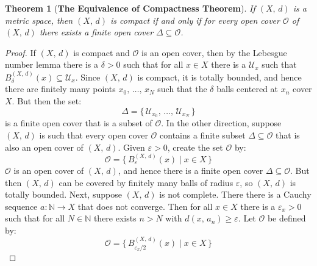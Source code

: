 \documentclass{article}
\theoremstyle{plain}
\newtheorem{theorem}{Theorem}[section]
\theoremstyle{normal}
\begin{document}
        \begin{theorem}[\textbf{The Equivalence of Compactness Theorem}]
            If $(X,\,d)$ is a metric space, then $(X,\,d)$ is compact if and
            only if for every open cover $\mathcal{O}$ of $(X,\,d)$ there exists
            a finite open cover $\Delta\subseteq\mathcal{O}$.
        \end{theorem}
        \begin{proof}
            If $(X,\,d)$ is compact and $\mathcal{O}$ is an open cover, then
            by the Lebesgue number lemma there is a $\delta>0$ such that for
            all $x\in{X}$ there is a $\mathcal{U}_{x}$ such that
            $B_{\delta}^{(X,\,d)}(x)\subseteq\mathcal{U}_{x}$. Since
            $(X,\,d)$ is compact, it is totally bounded, and hence there are
            finitely many points $x_{0},\,\dots,\,x_{N}$ such that the
            $\delta$ balls centered at $x_{n}$ cover $X$. But then the set:
            \begin{equation}
                \Delta=\{\,\mathcal{U}_{x_{0}},\,\dots,\,\mathcal{U}_{x_{N}}\,\}
            \end{equation}
            is a finite open cover that is a subset of $\mathcal{O}$. In the
            other direction, suppose $(X,\,d)$ is such that every open cover
            $\mathcal{O}$ contains a finite subset $\Delta\subseteq\mathcal{O}$
            that is also an open cover of $(X,\,d)$. Given $\varepsilon>0$,
            create the set $\mathcal{O}$ by:
            \begin{equation}
                \mathcal{O}=\{\,B_{\varepsilon}^{(X,\,d)}(x)\;|\;x\in{X}\,\}
            \end{equation}
            $\mathcal{O}$ is an open cover of $(X,\,d)$, and hence there is a
            finite open cover $\Delta\subseteq\mathcal{O}$. But then $(X,\,d)$
            can be covered by finitely many balls of radius $\varepsilon$, so
            $(X,\,d)$ is totally bounded. Next, suppose $(X,\,d)$ is not
            complete. There there is a Cauchy sequence
            $a:\mathbb{N}\rightarrow{X}$ that does not converge. Then for all
            $x\in{X}$ there is a $\varepsilon_{x}>0$ such that for all
            $N\in\mathbb{N}$ there exists $n>N$ with
            $d(x,\,a_{n})\geq\varepsilon$. Let $\mathcal{O}$ be defined by:
            \begin{equation}
                \mathcal{O}=\{\,B_{\varepsilon_{x}/2}^{(X,\,d)}(x)\;|\;x\in{X}\,\}
            \end{equation}

\end{proof}
\end{document}
